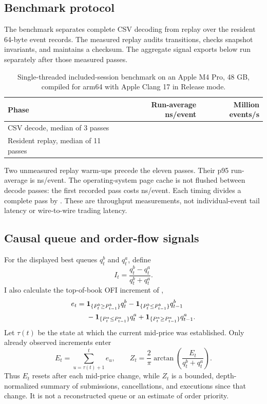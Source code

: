 \documentclass[11pt,a4paper]{article}
\begin{document}
\subsection{Benchmark protocol}

The benchmark separates complete CSV decoding from replay over the resident
64-byte event records. The measured replay audits transitions, checks snapshot
invariants, and maintains a checksum. The aggregate signal exports below run
separately after those measured passes.

\begin{table}[H]
  \centering
  \caption{Single-threaded included-session benchmark on an Apple M4 Pro,
  48 GB, compiled for arm64 with Apple Clang 17 in Release mode.}
  \label{tab:replaybenchmark}
  \begin{tabular}{lrr}
    \toprule
    Phase & Run-average ns/event & Million events/s \\
    \midrule
    CSV decode, median of 3 passes & \DecodeMedianNs{} & \DecodeThroughput{} \\
    Resident replay, median of 11 passes & \ReplayMedianNs{} & \ReplayThroughput{} \\
    \bottomrule
  \end{tabular}
\end{table}

Two unmeasured replay warm-ups precede the eleven passes. Their p95 run-average
is \ReplayPninetyfiveNs{} ns/event. The operating-system page cache is not
flushed between decode passes: the first recorded pass costs \FirstDecodeNs{}
ns/event. Each timing divides a complete pass by \ReplayEvents{}. These are
throughput measurements, not individual-event tail latency or wire-to-wire
trading latency.

\subsection{Causal queue and order-flow signals}

For the displayed best queues $q_t^b$ and $q_t^a$, define
\begin{equation}
  I_t = \frac{q_t^b-q_t^a}{q_t^b+q_t^a}.
\end{equation}
I also calculate the top-of-book OFI increment of \citet{cont2014},
\begin{align}
e_t={}&
  \mathbf{1}_{\{P_t^b\geq P_{t-1}^b\}}q_t^b
  -\mathbf{1}_{\{P_t^b\leq P_{t-1}^b\}}q_{t-1}^b \notag\\
&-\mathbf{1}_{\{P_t^a\leq P_{t-1}^a\}}q_t^a
  +\mathbf{1}_{\{P_t^a\geq P_{t-1}^a\}}q_{t-1}^a .
\end{align}
Let $\tau(t)$ be the state at which the current mid-price was established.
Only already observed increments enter
\begin{equation}
  E_t=\sum_{u=\tau(t)+1}^{t}e_u,\qquad
  Z_t=\frac{2}{\pi}\arctan\left(\frac{E_t}{q_t^b+q_t^a}\right).
\end{equation}
Thus $E_t$ resets after each mid-price change, while $Z_t$ is a bounded,
depth-normalized summary of submissions, cancellations, and executions since
that change. It is not a reconstructed queue or an estimate of order priority.
\end{document}
